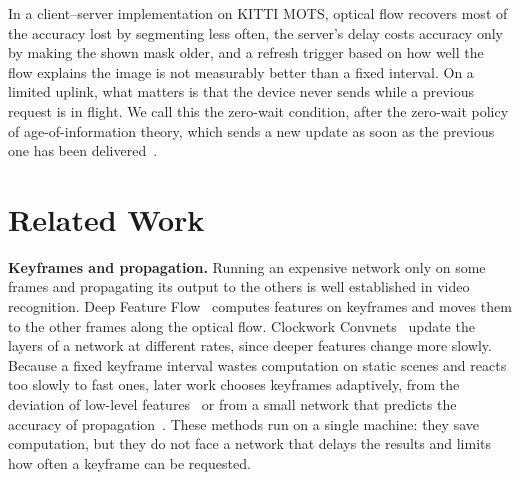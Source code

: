 \documentclass[conference]{IEEEtran}
\begin{document}
In a client--server implementation on KITTI MOTS, optical flow recovers most of the accuracy lost by segmenting less often, the server's delay costs accuracy only by making the shown mask older, and a refresh trigger based on how well the flow explains the image is not measurably better than a fixed interval. On a limited uplink, what matters is that the device never sends while a previous request is in flight. We call this the zero-wait condition, after the zero-wait policy of age-of-information theory, which sends a new update as soon as the previous one has been delivered~\cite{sun2016update}.

\section{Related Work}

\textbf{Keyframes and propagation.} Running an expensive network only on some frames and propagating its output to the others is well established in video recognition. Deep Feature Flow~\cite{zhu2017dff} computes features on keyframes and moves them to the other frames along the optical flow. Clockwork Convnets~\cite{shelhamer2016clockwork} update the layers of a network at different rates, since deeper features change more slowly. Because a fixed keyframe interval wastes computation on static scenes and reacts too slowly to fast ones, later work chooses keyframes adaptively, from the deviation of low-level features~\cite{li2018lowlatency} or from a small network that predicts the accuracy of propagation~\cite{xu2018dvsnet}. These methods run on a single machine: they save computation, but they do not face a network that delays the results and limits how often a keyframe can be requested.
\end{document}

